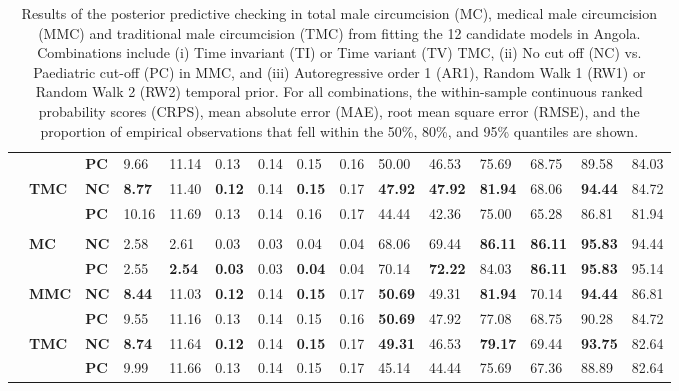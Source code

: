 {\begin{table}[H]
\begin{tabular}{>{\bfseries}p{0.05cm} p{0.85cm} p{0.75cm} C{1.25cm} C{1.25cm} C{1.25cm} C{1.25cm} C{1.25cm} C{1.25cm} C{1.25cm} C{1.25cm} C{1.25cm} C{1.25cm} C{1.25cm} C{1.25cm}}
  &  & \bf PC &  9.66 & 11.14 &  0.13 &  0.14 &  0.15 &  0.16 & 50.00 & 46.53 & 75.69 & 68.75 & 89.58 & 84.03\\[3pt] 
  & \bf TMC & \bf NC & \bf 8.77 & 11.40 & \bf 0.12 &  0.14 & \bf 0.15 &  0.17 & \bf47.92 & \bf47.92 & \bf81.94 & 68.06 & \bf94.44 & 84.72\\ 
  &  & \bf PC & 10.16 & 11.69 &  0.13 &  0.14 &  0.16 &  0.17 & 44.44 & 42.36 & 75.00 & 65.28 & 86.81 & 81.94\\[3pt] 
     \\ 
 & \bf MC & \bf NC &  2.58 &  2.61 &  0.03 &  0.03 &  0.04 &  0.04 & 68.06 & 69.44 & \bf86.11 & \bf86.11 & \bf95.83 & 94.44\\ 
  &  & \bf PC &  2.55 & \bf 2.54 & \bf 0.03 &  0.03 & \bf 0.04 &  0.04 & 70.14 & \bf72.22 & 84.03 & \bf86.11 & \bf95.83 & 95.14\\[3pt] 
  & \bf MMC & \bf NC & \bf 8.44 & 11.03 & \bf 0.12 &  0.14 & \bf 0.15 &  0.17 & \bf50.69 & 49.31 & \bf81.94 & 70.14 & \bf94.44 & 86.81\\ 
  &  & \bf PC &  9.55 & 11.16 &  0.13 &  0.14 &  0.15 &  0.16 & \bf50.69 & 47.92 & 77.08 & 68.75 & 90.28 & 84.72\\[3pt] 
  & \bf TMC & \bf NC & \bf 8.74 & 11.64 & \bf 0.12 &  0.14 & \bf 0.15 &  0.17 & \bf49.31 & 46.53 & \bf79.17 & 69.44 & \bf93.75 & 82.64\\ 
  &  & \bf PC &  9.99 & 11.66 &  0.13 &  0.14 &  0.15 &  0.17 & 45.14 & 44.44 & 75.69 & 67.36 & 88.89 & 82.64\\[3pt] 
  \hline 
  \end{tabular} 
  \caption{Results of the posterior predictive checking in total male circumcision (MC), medical male circumcision (MMC) and traditional male circumcision (TMC) from fitting the 12 candidate models in Angola. Combinations include (i) Time invariant (TI) or Time variant (TV) TMC, (ii) No cut off (NC) vs. Paediatric cut-off (PC) in MMC, and (iii) Autoregressive order 1 (AR1), Random Walk 1 (RW1) or Random Walk 2 (RW2) temporal prior. For all combinations, the within-sample continuous ranked probability scores (CRPS), mean absolute error (MAE), root mean square error (RMSE), and the proportion of empirical observations that fell within the 50\%, 80\%, and 95\% quantiles are shown.} 
  \label{tab::PPC1AGO} 
\end{table}} 


